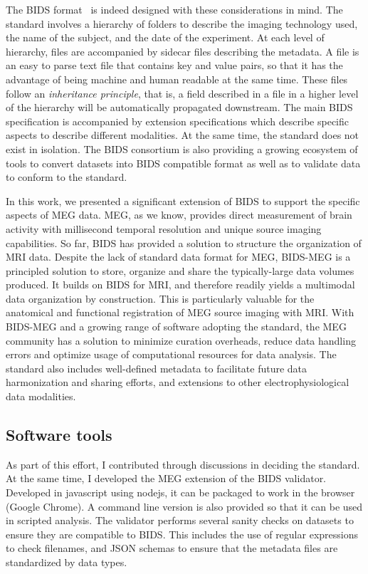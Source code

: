 The \ac{BIDS} format~\citep{gorgolewski2016brain} is indeed designed with these considerations in mind. 
The standard involves a hierarchy of folders to describe the imaging technology used, the name of the subject, and the date of the experiment. 
At each level of hierarchy, files are accompanied by sidecar  files describing the metadata. 
A  file is an easy to parse text file that contains key and value pairs, so that it has the advantage of being machine and human readable at the same time. 
These files follow an \emph{inheritance principle}, that is, a field described in a  file in a higher level of the hierarchy will be automatically propagated downstream. 
The main BIDS specification is accompanied by extension specifications which describe specific aspects to describe different modalities.
At the same time, the standard does not exist in isolation.
The \ac{BIDS} consortium is also providing a growing ecosystem of tools to convert datasets into \ac{BIDS} compatible format as well as to validate data to conform to the standard. 

In this work, we presented a significant extension of \ac{BIDS} to support the specific aspects of \ac{MEG} data. \Ac{MEG}, as we know, provides direct measurement of brain activity with millisecond temporal resolution and unique source imaging capabilities. So far, \ac{BIDS} has provided a solution to structure the organization of \ac{MRI} data. Despite the lack of standard data format for \ac{MEG}, BIDS-MEG is a principled solution to store, organize and share the typically-large data volumes produced. It builds on \ac{BIDS} for \ac{MRI}, and therefore readily yields a multimodal data organization by construction. This is particularly valuable for the anatomical and functional registration of \ac{MEG} source imaging with \ac{MRI}. With BIDS-MEG and a growing range of software adopting the standard, the \ac{MEG} community has a solution to minimize curation overheads, reduce data handling errors and optimize usage of computational resources for data analysis. The standard also includes well-defined metadata to facilitate future data harmonization and sharing efforts, and extensions to other electrophysiological data modalities.

\subsection*{Software tools}
As part of this effort, I contributed through discussions in deciding the standard. At the same time, I developed the MEG extension of the BIDS validator. Developed in javascript using nodejs, it can be packaged to work in the browser (Google Chrome). A command line version is also provided so that it can be used in scripted analysis. The validator performs several sanity checks on datasets to ensure they are compatible to BIDS. This includes the use of regular expressions to check filenames, and \ac{JSON} schemas to ensure that the metadata files are standardized by data types.

